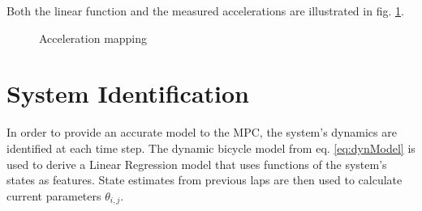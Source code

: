 Both the linear function and the measured accelerations are illustrated in fig. \ref{fig:v_over_u}.

\begin{figure}[ht]
    \centering
      
    \caption{Acceleration mapping}
    \label{fig:v_over_u}
\end{figure}



\section{System Identification}
In order to provide an accurate model to the MPC, the system's dynamics are identified at each time step. The dynamic bicycle model from eq. \ref{eq:dynModel} is used to derive a Linear Regression model that uses functions of the system's states as features. State estimates from previous laps are then used to calculate current parameters $\theta_{i,j}$.

